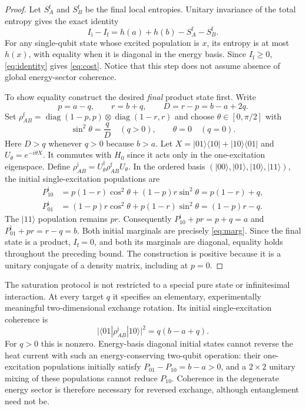 \documentclass[11pt,a4paper]{article}
\begin{document}
\begin{proof}
Let $S_A^{\mathrm f}$ and $S_B^{\mathrm f}$ be the final local entropies. Unitary invariance of the total entropy gives the exact identity
\begin{equation}\label{eq:identity}
I_{\mathrm i}-I_{\mathrm f}=h(a)+h(b)-S_A^{\mathrm f}-S_B^{\mathrm f}.
\end{equation}
For any single-qubit state whose excited population is $x$, its entropy is at most $h(x)$, with equality when it is diagonal in the energy basis. Since $I_{\mathrm f}\ge0$, \eqref{eq:identity} gives \eqref{eq:cost}. Notice that this step does not assume absence of global energy-sector coherence.

To show equality construct the desired \emph{final} product state first. Write
\begin{equation}\label{eq:pr}
p=a-q,\qquad r=b+q,\qquad D=r-p=b-a+2q.
\end{equation}
Set $\rho_{AB}^{\mathrm f}=\operatorname{diag}(1-p,p)\otimes\operatorname{diag}(1-r,r)$ and choose $\theta\in[0,\pi/2]$ with
\begin{equation}\label{eq:theta}
\sin^2\theta=\frac{q}{D}\quad(q>0),\qquad \theta=0\quad(q=0).
\end{equation}
Here $D>q$ whenever $q>0$ because $b>a$. Let $X=|01\rangle\langle10|+|10\rangle\langle01|$ and $U_\theta=e^{-i\theta X}$. It commutes with $H_0$ since it acts only in the one-excitation eigenspace. Define $\rho_{AB}^{\mathrm i}=U_\theta^\dagger\rho_{AB}^{\mathrm f}U_\theta$. In the ordered basis $(|00\rangle,|01\rangle,|10\rangle,|11\rangle)$, the initial single-excitation populations are
\[
\begin{split}
P_{10}^{\mathrm i}&=p(1-r)\cos^2\theta+(1-p)r\sin^2\theta=p(1-r)+q,\\
P_{01}^{\mathrm i}&=(1-p)r\cos^2\theta+p(1-r)\sin^2\theta=(1-p)r-q.
\end{split}
\]
The $|11\rangle$ population remains $pr$. Consequently $P_{10}^{\mathrm i}+pr=p+q=a$ and $P_{01}^{\mathrm i}+pr=r-q=b$. Both initial marginals are precisely \eqref{eq:marg}. Since the final state is a product, $I_{\mathrm f}=0$, and both its marginals are diagonal, equality holds throughout the preceding bound. The construction is positive because it is a unitary conjugate of a density matrix, including at $p=0$.
\end{proof}

The saturation protocol is not restricted to a special pure state or infinitesimal interaction. At every target $q$ it specifies an elementary, experimentally meaningful two-dimensional exchange rotation. Its initial single-excitation coherence is
\begin{equation}\label{eq:z}
\bigl|\langle01|\rho_{AB}^{\mathrm i}|10\rangle\bigr|^2
=q(b-a+q).
\end{equation}
For $q>0$ this is nonzero. Energy-basis diagonal initial states cannot reverse the heat current with such an energy-conserving two-qubit operation: their one-excitation populations initially satisfy $P_{01}-P_{10}=b-a>0$, and a $2\times2$ unitary mixing of these populations cannot reduce $P_{10}$. Coherence in the degenerate energy sector is therefore necessary for reversed exchange, although entanglement need not be.
\end{document}
